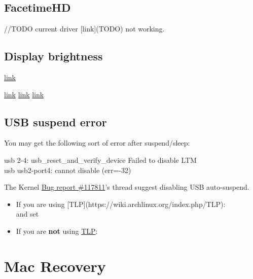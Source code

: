 \subsection{FacetimeHD}

//TODO current driver [link](TODO) not working.

\subsection{Display brightness}

\href{https://github.com/0xbb/apple_set_os.efi}{link}

\href{https://github.com/Dunedan/mbp-2016-linux/issues/38}{link}
\href{https://bugzilla.kernel.org/show_bug.cgi?id=105051#c37}{link}
\href{https://bugzilla.kernel.org/show_bug.cgi?id=105051#c39}{link}

\subsection{USB suspend error}

You may get the following sort of error after suspend/sleep:

\begin{codeblock}
    usb 2-4: usb\_reset\_and\_verify\_device Failed to disable LTM\\
    usb usb2-port4: cannot disable (err=-32)
\end{codeblock}

The Kernel \href{https://bugzilla.kernel.org/show_bug.cgi?id=117811}{Bug report \#117811}'s thread suggest disabling USB auto-suspend.

\begin{itemize}[noitemsep,topsep=0pt,leftmargin=*]
    \item If you are using [TLP](https://wiki.archlinux.org/index.php/TLP):\\
         and set 
    \item If you are \textbf{not} using \href{https://wiki.archlinux.org/index.php/TLP}{TLP}:\\
\end{itemize}



\section{Mac Recovery}

